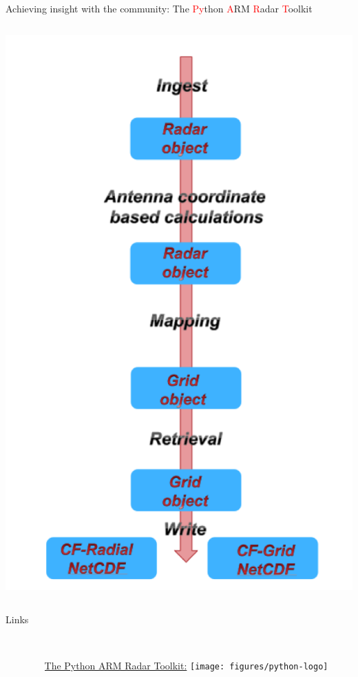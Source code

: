 \documentclass[final]{beamer}
\begin{document}
\begin{frame}{}
\begin{columns}[t]
\begin{column}{.3\linewidth}
\begin{block}{Achieving insight with the community: The \textcolor{red}{Py}thon \textcolor{red}{A}RM \textcolor{red}{R}adar \textcolor{red}{T}oolkit}
\begin{columns}[t]
\begin{column}{.4\linewidth}
                       \includegraphics[width=0.9\linewidth]{figures/pyart-flow}\\[1ex]   
                   \end{column}
               \end{columns}
                       \end{block}
        
         \begin{block}{Links}
         	\begin{columns}[c]
	\begin{column}{.02\linewidth}
	\end{column}
         		\begin{column}{.28\linewidth}
		   		\\
         			
         			{\small \hyperlink{http://arm-doe.github.io/pyart/}{The Python ARM Radar Toolkit:}} 
			        \texttt{[image: figures/python-logo]}\\[1ex]   


\end{column}
\end{columns}
\end{block}
\end{column}
\end{columns}
\end{frame}
\end{document}

